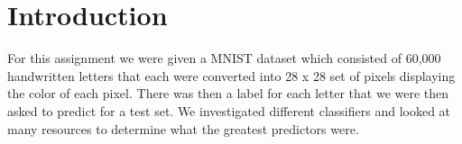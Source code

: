 
\section{Introduction}
\label{sec:intro}

For this assignment we were given a MNIST dataset which consisted of 60,000
handwritten letters that each were converted into 28 x 28 set of
pixels displaying the color of each pixel. There was then a label for
each letter that we were then asked to predict for a test set. We
investigated different classifiers and looked at many resources to
determine what the greatest predictors were. 
\cite{milgram}


